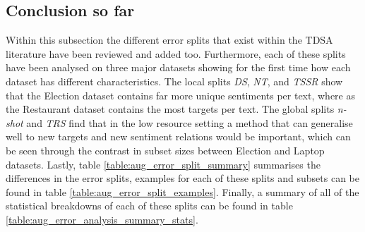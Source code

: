 \begin{figure}[ht!]
    \begin{floatrow}
    \end{floatrow}
\end{figure}

\subsection{Conclusion so far}
Within this subsection the different error splits that exist within the TDSA literature have been reviewed and added too. Furthermore, each of these splits have been analysed on three major datasets showing for the first time how each dataset has different characteristics. The local splits \textit{DS}, \textit{NT}, and \textit{TSSR} show that the Election dataset contains far more unique sentiments per text, where as the Restaurant dataset contains the most targets per text. The global splits \textit{n-shot} and \textit{TRS} find that in the low resource setting a method that can generalise well to new targets and new sentiment relations would be important, which can be seen through the contrast in subset sizes between Election and Laptop datasets. Lastly, table \ref{table:aug_error_split_summary} summarises the differences in the error splits, examples for each of these splits and subsets can be found in table \ref{table:aug_error_split_examples}. Finally, a summary of all of the statistical breakdowns of each of these splits can be found in table \ref{table:aug_error_analysis_summary_stats}.

